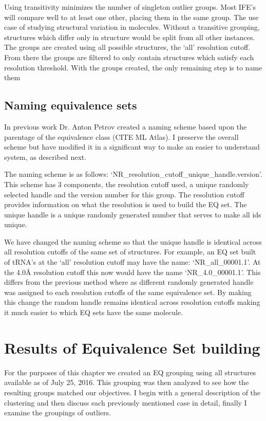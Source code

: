 Using transitivity minimizes the number of singleton outlier groups. Most IFE’s
will compare well to at least one other, placing them in the same group. The use
case of studying structural variation in molecules. Without a transitive
grouping, structures which differ only in structure would be split from all
other instances. The groups are created using all possible structures, the ‘all’
resolution cutoff. From there the groups are filtered to only contain structures
which satisfy each resolution threshold. With the groups created, the only
remaining step is to name them

\subsection{Naming equivalence sets}

In previous work Dr. Anton Petrov created a naming scheme based upon the
parentage of the equivalence class (CITE ML Atlas). I preserve the overall
scheme but have modified it in a significant way to make an easier to understand
system, as described next.

The naming scheme is as follows:
‘NR\_{resolution\_cutoff}\_{unique\_handle}.{version}’. This scheme has 3
components, the resolution cutoff used, a unique randomly selected handle and
the version number for this group. The resolution cutoff provides information on
what the resolution is used to build the EQ set. The unique handle is a unique
randomly generated number that serves to make all ids unique.

We have changed the naming scheme so that the unique handle is identical across
all resolution cutoffs of the same set of structures. For example, an EQ set
built of tRNA’s at the ‘all’ resolution cutoff may have the name:
‘NR\_all\_00001.1’. At the 4.0Å resolution cutoff this now would have the name
‘NR\_4.0\_00001.1’. This differs from the previous method where as different
randomly generated handle was assigned to each resolution cutoffs of the same
equivalence set. By making this change the random handle remains identical
across resolution cutoffs making it much easier to which EQ sets have the same
molecule.

\section{Results of Equivalence Set building}

For the purposes of this chapter we created an EQ grouping using all structures
available as of July 25, 2016. This grouping was then analyzed to see how the
resulting groups matched our objectives. I begin with a general description of
the clustering and then discuss each previously mentioned case in detail,
finally I examine the groupings of outliers. 


